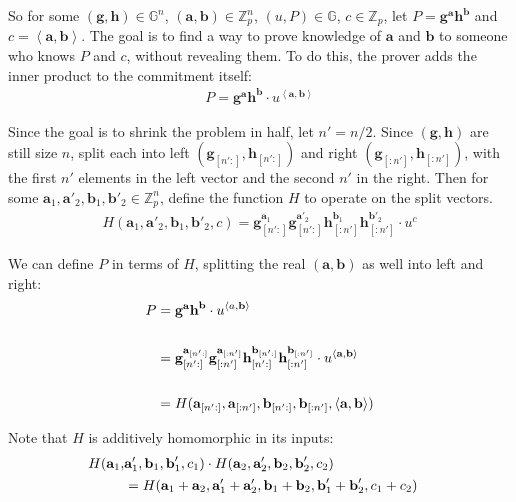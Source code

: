 \documentclass{article}
\begin{document}
So for some $(\textbf{g}, \textbf{h}) \in \mathbb{G}^n$, $(\textbf{a}, \textbf{b}) \in \mathbb{Z}_p^n$, $(u, P) \in \mathbb{G}$, $c \in \mathbb{Z}_p$, let $P = \textbf{g}^\textbf{a} \textbf{h}^\textbf{b}$ and $c = \left<\textbf{a}, \textbf{b}\right>$.  The goal is to find a way to prove knowledge of $\textbf{a}$ and $\textbf{b}$ to someone who knows $P$ and $c$, without revealing them.  To do this, the prover adds the inner product to the commitment itself:
\begin{align}
  P = \textbf{g}^\textbf{a} \textbf{h}^\textbf{b} \cdot u^{\left<\textbf{a}, \textbf{b}\right>}
\end{align}

Since the goal is to shrink the problem in half, let $n' = n/2$.  Since $(\textbf{g}, \textbf{h})$ are still size $n$, split each into left $(\textbf{g}_{[n':]}, \textbf{h}_{[n':]})$ and right $(\textbf{g}_{[:n']}, \textbf{h}_{[:n']})$, with the first $n'$ elements in the left vector and the second $n'$ in the right.  Then for some $\textbf{a}_1, \textbf{a}'_2, \textbf{b}_1, \textbf{b}'_2 \in \mathbb{Z}_p^n$, define the function $H$ to operate on the split vectors. 
\begin{align}
  H(\textbf{a}_1, \textbf{a}'_2, \textbf{b}_1, \textbf{b}'_2, c) = \textbf{g}_{[n':]}^{\textbf{a}_1} \textbf{g}_{[n':]}^{\textbf{a}'_2} \textbf{h}_{[:n']}^{\textbf{b}_1} \textbf{h}_{[:n']}^{\textbf{b}'_2} \cdot u^c
\end{align}

We can define $P$ in terms of $H$, splitting the real $(\textbf{a}, \textbf{b})$ as well into left and right:
\begin{align}
  P &= \textbf{g}^{\textbf{a}} \textbf{h}^{\textbf{b}} \cdot u^{\left<a, \textbf{b}\right>}\\
  \cr &= \textbf{g}_{[n':]}^{\textbf{a}_{[n':]}} \textbf{g}_{[:n']}^{\textbf{a}_{[:n']}} \textbf{h}_{[n':]}^{\textbf{b}_{[n':]}} \textbf{h}_{[:n']}^{\textbf{b}_{[:n']}} \cdot u^{\left<\textbf{a}, \textbf{b}\right>}\\
  \cr &= H(\textbf{a}_{[n':]}, \textbf{a}_{[:n']}, \textbf{b}_{[n':]}, \textbf{b}_{[:n']}, \left<\textbf{a}, \textbf{b}\right>)
\end{align}

Note that $H$ is additively homomorphic in its inputs:
\begin{align}
  H(\textbf{a}_1, & \textbf{a}'_1, \textbf{b}_1, \textbf{b}'_1, c_1) \cdot H(\textbf{a}_2, \textbf{a}'_2, \textbf{b}_2, \textbf{b}'_2, c_2)
  \cr &= H(\textbf{a}_1 + \textbf{a}_2, \textbf{a}'_1 + \textbf{a}'_2, \textbf{b}_1 + \textbf{b}_2, \textbf{b}'_1 + \textbf{b}'_2, c_1 + c_2)
\end{align}
\end{document}
